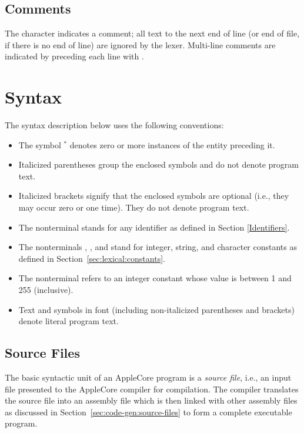 \documentclass[10pt]{article}
\begin{document}
\subsection{Comments}
\label{sec:lexical:comments}

The character \kwd{\#} indicates a comment; all text to the next end
of line (or end of file, if there is no end of line) are ignored by
the lexer.  Multi-line comments are indicated by preceding each line
with \kwd{\#}.

\section{Syntax}
\label{sec:syntax}

The syntax description below uses the following conventions:
%
\begin{itemize}
%
\item The symbol $^*$ denotes zero or more instances of the entity
  preceding it.
%
\item Italicized parentheses \group{} group the enclosed symbols and
  do not denote program text.
%
\item Italicized brackets \opt{} signify that the enclosed symbols are
  optional (i.e., they may occur zero or one time).  They do not
  denote program text.
%
\item The nonterminal  stands for any identifier
  as defined in Section \ref{Identifiers}.
%
\item The nonterminals ,
  , and  stand for integer,
  string, and character constants as defined in
  Section~\ref{sec:lexical:constants}.
%
\item The nonterminal  refers to an integer constant
  whose value is between 1 and 255 (inclusive).
%
\item Text and symbols in  font (including
  non-italicized parentheses and brackets) denote literal program
  text.
%
\end{itemize}

\subsection{Source Files}
\label{sec:syntax:source-files}

The basic syntactic unit of an AppleCore program is a \emph{source
  file}, i.e., an input file presented to the AppleCore compiler for
compilation.  The compiler translates the source file into an assembly
file which is then linked with other assembly files as discussed in
Section~\ref{sec:code-gen:source-files} to form a complete executable
program.
\end{document}
